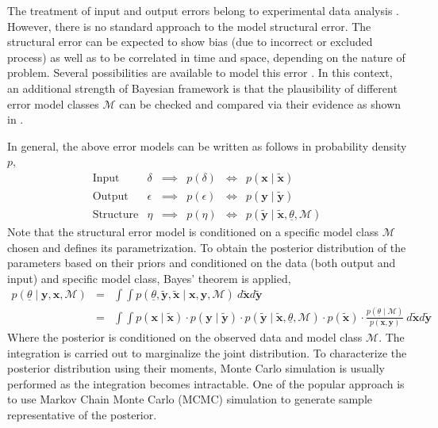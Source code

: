 \documentclass[11pt,titlepage]{article}
\begin{document}
The treatment of input and output errors belong to experimental data analysis . 
However, there is no standard approach to the model structural error. 
The structural error can be expected to show bias (due to incorrect or excluded process) as well as to be correlated in time and space, depending on the nature of problem. 
Several possibilities are available to model this error \cite{Simoen2013, Schoups2010}. 
In this context, an additional strength of Bayesian framework is that the plausibility of different error model classes $\mathcal{M}$ can be checked and compared via their evidence as shown in \cite{Beck2010}.

In general, the above error models can be written as follows in probability density $p$,
\begin{equation}
\begin{array}{lrcrcr} 
	\text{Input} 	& \delta & \implies & p(\delta)	 	& \iff & p(\mathbf{x} \mid \mathbf{\tilde{x}}) \\ 
	\text{Output} 	& \epsilon & \implies & p(\epsilon) 	& \iff & p(\mathbf{y} \mid \mathbf{\tilde{y}}) \\
	\text{Structure}	& \eta  & \implies & p(\eta) 		& \iff & p(\mathbf{\tilde{y}} \mid \mathbf{\tilde{x}}, \underline{\theta}, \mathcal{M}) 
\end{array}
\nonumber
\end{equation}
Note that the structural error model is conditioned on a specific model class $\mathcal{M}$ chosen and defines its parametrization. 
To obtain the posterior distribution of the parameters based on their priors and conditioned on the data (both output and input) and specific model class, Bayes' theorem is applied,
\begin{equation}
\begin{array}{rcl} 
	p(\underline{\theta} \mid \mathbf{y}, \mathbf{x}, \mathcal{M} )	& = & \int \int p(\underline{\theta}, \mathbf{\tilde{y}}, \mathbf{\tilde{x}} \mid \mathbf{x}, \mathbf{y}, \mathcal{M} ) \: d\mathbf{\tilde{x}} d\mathbf{\tilde{y}} \\ 
		& = & \int \int p(\mathbf{x} \mid \mathbf{\tilde{x}}) \cdot p(\mathbf{y} \mid \mathbf{\tilde{y}}) \cdot p(\mathbf{\tilde{y}} \mid \mathbf{\tilde{x}}, \underline{\theta}, \mathcal{M} ) \cdot p(\mathbf{\tilde{x}}) \cdot \frac{p(\underline{\theta} \mid \mathcal{M})}{p(\mathbf{x}, \mathbf{y})} \: d\mathbf{\tilde{x}} d\mathbf{\tilde{y}}
\end{array}
\nonumber
\end{equation}
Where the posterior is conditioned on the observed data and model class $\mathcal{M}$. 
The integration is carried out to marginalize the joint distribution. 
To characterize the posterior distribution using their moments, Monte Carlo simulation is usually performed as the integration becomes intractable. 
One of the popular approach is to use Markov Chain Monte Carlo (MCMC) simulation to generate sample representative of the posterior.
\end{document}

